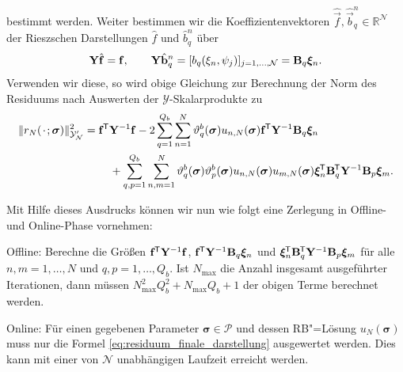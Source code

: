 \documentclass[../main.tex]{subfiles}
\begin{document}
bestimmt werden.
Weiter bestimmen wir die Koeffizientenvektoren $\hat{\vec{f}}, \hat{\vec{b}}^{n}_{q} \in \mathbb{R}^{\mathcal N}$ der Rieszschen Darstellungen $\hat{f}$ und $\hat{b}^{n}_{q}$ über
\begin{equation}
    \mathbf{Y} \hat{\mathbf{f}} = \mathbf{f},
    \qquad
    \mathbf{Y} \hat{\mathbf{b}}^{n}_{q} = [b_{q}(\xi_{n}, \psi_{j})]_{j = 1, \dots, \mathcal N} = \mathbf{B}_{q} \bm \xi_{n}.
\end{equation}
Verwenden wir diese, so wird obige Gleichung zur Berechnung der Norm des Residuums nach Auswerten der $\mathcal Y$-Skalarprodukte zu
\begin{equation}\label{eq:residuum_finale_darstellung}
    \begin{aligned}
        \norm{r_{N}(\blank; \bm \sigma)}_{\mathcal Y_{\mathcal N}'}^{2}
        = \begin{multlined}[t]
            \vec{f}\tran \mat{Y}^{-1} \vec{f}
                - 2 \sum_{q = 1}^{Q_b} \sum_{n = 1}^{N} \theta_{q}^{b}(\bm \sigma) u_{n,N}(\bm \sigma) \vec{f}\tran \mat{Y}^{-1} \mat{B}_{q} \bm \xi_{n}
                \\+ \sum_{q, p = 1}^{Q_b} \sum_{n, m = 1}^{N} \theta_{q}^{b}(\bm \sigma) \theta_{p}^{b}(\bm \sigma) u_{n,N}(\bm \sigma) u_{m,N}(\bm \sigma) \bm \xi_{n}\tran \mat{B}_{q}\tran \mat{Y}^{-1} \mat{B}_{p} \bm \xi_{m}.
        \end{multlined}
    \end{aligned}
\end{equation}

Mit Hilfe dieses Ausdrucks können wir nun wie folgt eine Zerlegung in Offline- und Online-Phase vornehmen:

\begin{onoffdescription}
    \item[Offline:] Berechne die Größen $\mathbf{f}^{\mkern-1.5mu\mathsf{T}} \mathbf{Y}^{-1} \mathbf{f}$, $\mathbf{f}^{\mkern-1.5mu\mathsf{T}} \mathbf{Y}^{-1} \mathbf{B}_{q} \bm \xi_{n}$ und $\bm \xi_{n}^{\mkern-1.5mu\mathsf{T}} \mathbf{B}_{q}^{\mkern-1.5mu\mathsf{T}} \mathbf{Y}^{-1} \mathbf{B}_{p} \bm \xi_{m}$ für alle $n, m = 1, \dots, N$ und $q, p = 1, \dots, Q_b$.
    Ist $N_{\max}$ die Anzahl insgesamt ausgeführter Iterationen, dann müssen $N_{\max}^2 Q_{b}^{2} + N_{\max} Q_{b} + 1$ der obigen Terme berechnet werden.

    \item[Online:] Für einen gegebenen Parameter $\bm \sigma \in \mathcal P$ und dessen RB"=Lösung $u_{N}(\bm \sigma)$ muss nur die Formel \cref{eq:residuum_finale_darstellung} ausgewertet werden.
    Dies kann mit einer von $\mathcal N$ unabhängigen Laufzeit erreicht werden.
\end{onoffdescription}
\end{document}
